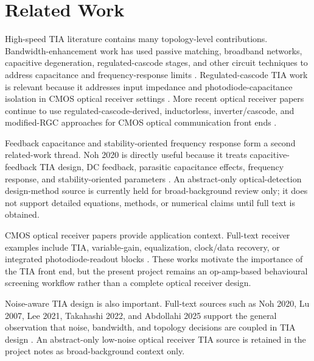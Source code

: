 \section{Related Work}

High-speed TIA literature contains many topology-level contributions. Bandwidth-enhancement work has used passive matching, broadband networks, capacitive degeneration, regulated-cascode stages, and other circuit techniques to address capacitance and frequency-response limits \citep{ANALUI_2004_BW_ENHANCEMENT,LU_2007_BROADBAND_TIA}. Regulated-cascode TIA work is relevant because it addresses input impedance and photodiode-capacitance isolation in CMOS optical receiver settings \citep{PARK_YOO_2004_RGC_TIA}. More recent optical receiver papers continue to use regulated-cascode-derived, inductorless, inverter/cascode, and modified-RGC approaches for CMOS optical communication front ends \citep{XU_2011_INDUCTORLESS_TIA,LEE_2021_4GHZ_SDT_VG_TIA,TAKAHASHI_2022_LOCAL_FEEDBACK_RGC,PAN_LUO_2022_20GBPS_TIA,ABDOLLAHI_2025_MDFRGC_TIA}.

Feedback capacitance and stability-oriented frequency response form a second related-work thread. Noh 2020 is directly useful because it treats capacitive-feedback TIA design, DC feedback, parasitic capacitance effects, frequency response, and stability-oriented parameters \citep{NOH_2020_CF_TIA_DC_LOOP}.
An abstract-only optical-detection design-method source is currently held for broad-background review only; it does not support detailed equations, methods, or numerical claims until full text is obtained.

CMOS optical receiver papers provide application context. Full-text receiver examples include TIA, variable-gain, equalization, clock/data recovery, or integrated photodiode-readout blocks \citep{PAN_2022_26GBPS_RX,MESGARI_2024_MULTI_DOT_PIN_RX}. These works motivate the importance of the TIA front end, but the present project remains an op-amp-based behavioural screening workflow rather than a complete optical receiver design.

Noise-aware TIA design is also important. Full-text sources such as Noh 2020, Lu 2007, Lee 2021, Takahashi 2022, and Abdollahi 2025 support the general observation that noise, bandwidth, and topology decisions are coupled in TIA design \citep{NOH_2020_CF_TIA_DC_LOOP,LU_2007_BROADBAND_TIA,LEE_2021_4GHZ_SDT_VG_TIA,TAKAHASHI_2022_LOCAL_FEEDBACK_RGC,ABDOLLAHI_2025_MDFRGC_TIA}.
An abstract-only low-noise optical receiver TIA source is retained in the project notes as broad-background context only.

